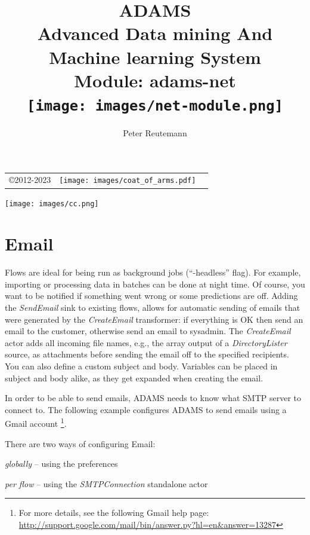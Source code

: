 \documentclass[a4paper]{book}
\title{
  \textbf{ADAMS} \\
  {\Large \textbf{A}dvanced \textbf{D}ata mining \textbf{A}nd \textbf{M}achine
  learning \textbf{S}ystem} \\
  {\Large Module: adams-net} \\
  \vspace{1cm}
  \texttt{[image: images/net-module.png]} \\
}
\author{
  Peter Reutemann
}
\begin{document}
\begin{titlepage}
\maketitle

\thispagestyle{empty}
\center
\begin{table}[b]
	\begin{tabular}{c l l}
		\parbox[c][2cm]{2cm}{\copyright 2012-2023} &
		\parbox[c][2cm]{5cm}{\texttt{[image: images/coat\_of\_arms.pdf]}} \\
	\end{tabular}
	\texttt{[image: images/cc.png]} \\
\end{table}

\end{titlepage}

\tableofcontents
\listoffigures


\chapter{Email}
Flows are ideal for being run as background jobs (``-headless'' flag). For
example, importing or processing data in batches can be done at night time. 
Of course, you want to be notified if something went wrong or some predictions
are off. Adding the \textit{SendEmail} sink to existing flows, allows for automatic
sending of emails that were generated by the \textit{CreateEmail} transformer: 
if everything is OK then send an email to the customer,
otherwise send an email to sysadmin. The \textit{CreateEmail} actor adds all incoming
file names, e.g., the array output of a \textit{DirectoryLister} source, as
attachments before sending the email off to the specified recipients. You can
also define a custom subject and body. Variables can be placed in subject and
body alike, as they get expanded when creating the email.

In order to be able to send emails, ADAMS needs to know what SMTP server to
connect to. The following example configures ADAMS to send emails using a Gmail
account \footnote{For more details, see the following Gmail help page: \\
\url{http://support.google.com/mail/bin/answer.py?hl=en&answer=13287}{}}. 

There are two ways of configuring Email:
\begin{tight_itemize}
	\item \textit{globally} -- using the preferences
	\item \textit{per flow} -- using the \textit{SMTPConnection} standalone actor
\end{tight_itemize}
\end{document}
